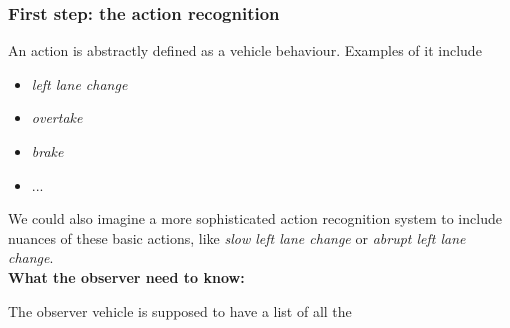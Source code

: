 \documentclass{beamer}
\begin{document}
\begin{frame}
\frametitle{First step: the action recognition}
An action is abstractly defined as a vehicle behaviour. Examples of
it include 
\begin{itemize}
\item \textit{left lane change}
\item \textit{overtake}
\item \textit{brake}
\item ...
\end{itemize}

We could also imagine a more sophisticated action recognition system
to include nuances of these basic actions, like \textit{slow left lane change} or
\textit{abrupt left lane change}.\\

\textbf{What the observer need to know:}

The observer vehicle is supposed to have a list of all the

\end{frame}


\begin{frame}\label{Conclusions}
\end{frame}
\end{document}
